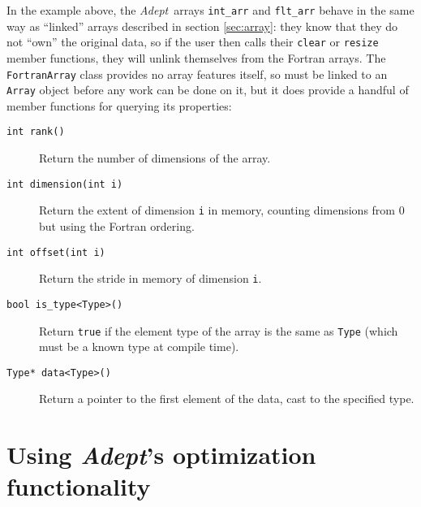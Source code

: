 \documentclass[a4,oneside]{book}
\def\codesize{\small}
\def\Adept{\emph{Adept}}
\def\code#1{{\codesize\texttt{#1}}}
\def\citem#1{\item[{\codesize\texttt{#1}}]}
\begin{document}
In the example above, the \Adept\ arrays \code{int\_arr} and
\code{flt\_arr} behave in the same way as ``linked'' arrays described
in section \ref{sec:array}: they know that they do not ``own'' the
original data, so if the user then calls their \code{clear} or
\code{resize} member functions, they will unlink themselves from the
Fortran arrays.  The \code{FortranArray} class provides no array
features itself, so must be linked to an \code{Array} object before
any work can be done on it, but it does provide a handful of member
functions for querying its properties:
\begin{description}
 \citem{int rank()} Return the number of dimensions of the array.
 \citem{int dimension(int i)} Return the extent of dimension \code{i}
 in memory, counting dimensions from 0 but using the Fortran ordering.
 \citem{int offset(int i)} Return the stride in memory of dimension
 \code{i}.
 \citem{bool is\_type<Type>()} Return \code{true} if the element type
 of the array is the same as \code{Type} (which must be a known type at
 compile time).
 \citem{Type* data<Type>()} Return a pointer to the first element of
 the data, cast to the specified type.
\end{description}

\chapter{Using \Adept's optimization functionality}
\label{chap:optimize}
\end{document}
